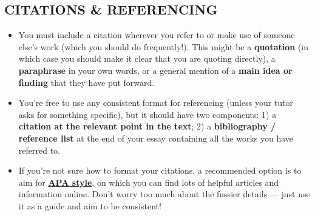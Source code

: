 \documentclass[10pt,a4paper]{article}
\begin{document}
\begin{multicols}{2}
\section*{CITATIONS \& REFERENCING}
\begin{itemize}
  \item You must include a citation wherever you refer to or make use of someone
else’s work (which you should do frequently!). This might be a
\textbf{quotation} (in which case you should make it clear that you are quoting
directly), a \textbf{paraphrase} in your own words, or a general mention of a
\textbf{main idea or finding} that they have put forward.
  \item You’re free to use any consistent format for referencing (unless your
tutor asks for something specific), but it should have two components: 1) a
\textbf{citation at the relevant point in the text}; 2) a \textbf{bibliography /
reference list} at the end of your essay containing all the works you have
referred to.
  \item If you’re not sure how to format your citations, a recommended option
is to aim for
\href{https://apastyle.apa.org/style-grammar-guidelines/references/examples}
{\textbf{APA style}}, on which you can find lots of helpful articles and
information online. Don’t worry too much about the fussier details --- just use
it as a guide and aim to be consistent!
\end{itemize}
\vspace{0.05em}

{\centering
\hspace{10pt}
}



\end{multicols}
\end{document}
